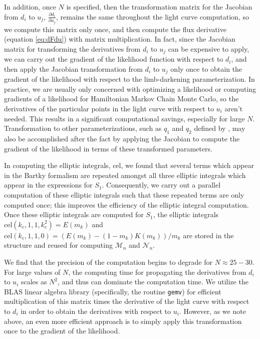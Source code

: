 \documentclass[modern]{aastex61}
\begin{document}
In addition, once $N$ is specified, then the transformation matrix for
the Jacobian from $d_i$ to $u_j$, $\frac{\partial d_i}{\partial u_j}$,  
remains the same throughout the light curve 
computation, so we compute this matrix only once, and then compute the
flux derivative (equation \ref{eq:dFdu}) with matrix multiplication.
In fact, since the Jacobian matrix for transforming the derivatives from $d_i$
to $u_j$ can be expensive to apply, we can carry out the gradient of the 
likelihood function with respect to $d_i$, and then apply the Jacobian 
transformation from $d_i$ to $u_j$ only once to obtain the gradient
of the likelihood with respect to the limb-darkening parameterization.
In practice, we are usually only concerned with optimizing a likelihood
or computing gradients of a likelihood for Hamiltonian Markov Chain
Monte Carlo, so the derivatives of the particular points in the
light curve with respect to $u_i$ aren't needed.  This results in a
significant computational savings, especially for large $N$.
Transformation to other parameterizations, such as $q_1$ and $q_2$
defined by \citet{Kipping2013}, may also be accomplished after the
fact by applying the Jacobian to compute the gradient of the likelihood 
in terms of these transformed parameters.

In computing the elliptic integrals, cel, we found that several terms
which appear in the Bartky formalism are repeated amongst all three elliptic 
integrals which appear in the expressions for $S_1$.  Consequently, we carry 
out a parallel computation of these elliptic integrals such that these
repeated terms are only computed once;  this improves the efficiency of
the elliptic integral computation.  Once these elliptic integrals
are computed for $S_1$, the elliptic integrals $\mathrm{cel}(k_c,1,1,k_c^2)=E(m_k)$
and $\mathrm{cel}(k_c,1,1,0)=(E(m_k)-(1-m_k)K(m_k))/m_k $ are
stored in the structure and reused for computing $\mathcal{M}_n$
and $\mathcal{N}_n$.

We find that the precision of the computation begins to degrade for
$N \approx 25-30$.  For large values of $N$, the computing time for
propagating the derivatives from $d_i$ to $u_i$ scales as $N^2$, and
thus can dominate the computation time.  We utilize the BLAS linear
algebra library (specifically, the routine \texttt{gemv}) for efficient 
multiplication of this matrix times the derivative of the light curve with 
respect to $d_i$ in order to obtain the derivatives with respect to $u_i$.
However, as we note above, an even more efficient approach is to
simply apply this transformation once to the gradient of the likelihood.
\end{document}
